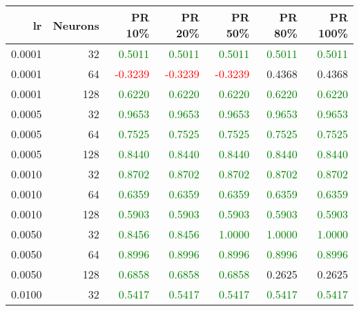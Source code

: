 \begin{tabular}{rrrrrrr}
\toprule
lr & Neurons & PR 10\% & PR 20\% & PR 50\% & PR 80\% & PR 100\% \\
\midrule
0.0001 & 32 & \textcolor{green} {0.5011} & \textcolor{green} {0.5011} & \textcolor{green} {0.5011} & \textcolor{green} {0.5011} & \textcolor{green} {0.5011} \\
0.0001 & 64 & \textcolor{red} {-0.3239} & \textcolor{red} {-0.3239} & \textcolor{red} {-0.3239} & \textcolor{blu} {0.4368} & \textcolor{blu} {0.4368} \\
0.0001 & 128 & \textcolor{green} {0.6220} & \textcolor{green} {0.6220} & \textcolor{green} {0.6220} & \textcolor{green} {0.6220} & \textcolor{green} {0.6220} \\
0.0005 & 32 & \textcolor{green} {0.9653} & \textcolor{green} {0.9653} & \textcolor{green} {0.9653} & \textcolor{green} {0.9653} & \textcolor{green} {0.9653} \\
0.0005 & 64 & \textcolor{green} {0.7525} & \textcolor{green} {0.7525} & \textcolor{green} {0.7525} & \textcolor{green} {0.7525} & \textcolor{green} {0.7525} \\
0.0005 & 128 & \textcolor{green} {0.8440} & \textcolor{green} {0.8440} & \textcolor{green} {0.8440} & \textcolor{green} {0.8440} & \textcolor{green} {0.8440} \\
0.0010 & 32 & \textcolor{green} {0.8702} & \textcolor{green} {0.8702} & \textcolor{green} {0.8702} & \textcolor{green} {0.8702} & \textcolor{green} {0.8702} \\
0.0010 & 64 & \textcolor{green} {0.6359} & \textcolor{green} {0.6359} & \textcolor{green} {0.6359} & \textcolor{green} {0.6359} & \textcolor{green} {0.6359} \\
0.0010 & 128 & \textcolor{green} {0.5903} & \textcolor{green} {0.5903} & \textcolor{green} {0.5903} & \textcolor{green} {0.5903} & \textcolor{green} {0.5903} \\
0.0050 & 32 & \textcolor{green} {0.8456} & \textcolor{green} {0.8456} & \textcolor{green} {1.0000} & \textcolor{green} {1.0000} & \textcolor{green} {1.0000} \\
0.0050 & 64 & \textcolor{green} {0.8996} & \textcolor{green} {0.8996} & \textcolor{green} {0.8996} & \textcolor{green} {0.8996} & \textcolor{green} {0.8996} \\
0.0050 & 128 & \textcolor{green} {0.6858} & \textcolor{green} {0.6858} & \textcolor{green} {0.6858} & \textcolor{blu} {0.2625} & \textcolor{blu} {0.2625} \\
0.0100 & 32 & \textcolor{green} {0.5417} & \textcolor{green} {0.5417} & \textcolor{green} {0.5417} & \textcolor{green} {0.5417} & \textcolor{green} {0.5417} \\

\end{tabular}
